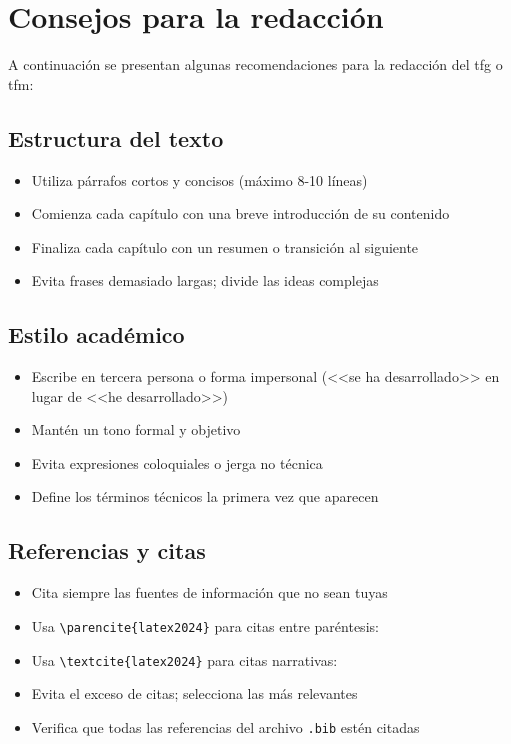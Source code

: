 \section{Consejos para la redacción}
\label{sec:consejos}

A continuación se presentan algunas recomendaciones para la redacción del \gls{tfg} o \gls{tfm}:

\subsection{Estructura del texto}

\begin{itemize}
  \item Utiliza párrafos cortos y concisos (máximo 8-10 líneas)
  \item Comienza cada capítulo con una breve introducción de su contenido
  \item Finaliza cada capítulo con un resumen o transición al siguiente
  \item Evita frases demasiado largas; divide las ideas complejas
\end{itemize}

\subsection{Estilo académico}

\begin{itemize}
  \item Escribe en tercera persona o forma impersonal (<<se ha desarrollado>> en lugar de <<he desarrollado>>)
  \item Mantén un tono formal y objetivo
  \item Evita expresiones coloquiales o jerga no técnica
  \item Define los términos técnicos la primera vez que aparecen
\end{itemize}

\subsection{Referencias y citas}

\begin{itemize}
  \item Cita siempre las fuentes de información que no sean tuyas
  \item Usa \verb|\parencite{latex2024}| para citas entre paréntesis: \parencite{knuth1984texbook}
  \item Usa \verb|\textcite{latex2024}| para citas narrativas: \textcite{lamport1994latex}
  \item Evita el exceso de citas; selecciona las más relevantes
  \item Verifica que todas las referencias del archivo \texttt{.bib} estén citadas
\end{itemize}

